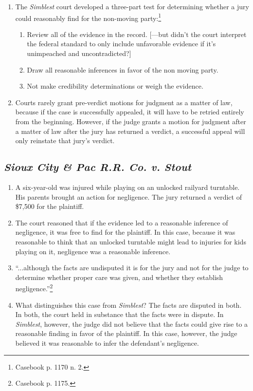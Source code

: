 \begin{enumerate}
    \item The \emph{Simblest} court developed a three-part test for determining whether a jury could reasonably find for the non-moving party:\footnote{Casebook p. 1170 n. 2.}
    \begin{enumerate}
        \item Review all of the evidence in the record. [---but didn't the court interpret the federal standard to only include unfavorable evidence if it's unimpeached and uncontradicted?]
        \item Draw all reasonable inferences in favor of the non moving party.
        \item Not make credibility determinations or weigh the evidence.
    \end{enumerate}
    \item Courts rarely grant pre-verdict motions for judgment as a matter of law, because if the case is successfully appealed, it will have to be retried entirely from the beginning. However, if the judge grants a motion for judgment after a matter of law after the jury has returned a verdict, a successful appeal will only reinstate that jury's verdict.
\end{enumerate}

\subsection{\emph{Sioux City \& Pac R.R. Co. v. Stout}}

\begin{enumerate}
    \item A six-year-old was injured while playing on an unlocked railyard turntable. His parents brought an action for negligence. The jury returned a verdict of \$7,500 for the plaintiff.
    \item The court reasoned that if the evidence led to a reasonable inference of negligence, it was free to find for the plaintiff. In this case, because it was reasonable to think that an unlocked turntable might lead to injuries for kids playing on it, negligence was a reasonable inference.
    \item ``...although the facts are undisputed it is for the jury and not for the judge to determine whether proper care was given, and whether they establish negligence.''\footnote{Casebook p. 1175.}
    \item What distinguishes this case from \emph{Simblest}? The facts are disputed in both. In both, the court held in substance that the facts were in dispute. In \emph{Simblest}, however, the judge did not believe that the facts could give rise to a reasonable finding in favor of the plaintiff. In this case, however, the judge believed it was reasonable to infer the defendant's negligence.
\end{enumerate}


